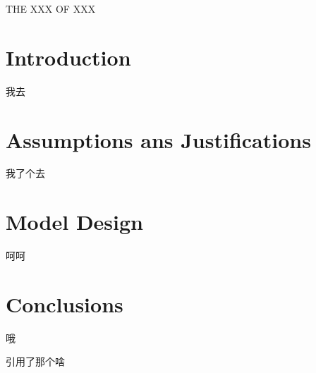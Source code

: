 \documentclass[12pt]{article}
\begin{document}
\begin{center}
\Large THE XXX OF XXX
\end{center}

\tableofcontents

\section{Introduction}
我去
\section{Assumptions ans Justifications}
我了个去
\section{Model Design}
呵呵
\section{Conclusions}
哦


\begin{thebibliography}
引用了那个啥
\end{thebibliography}
\end{document}
